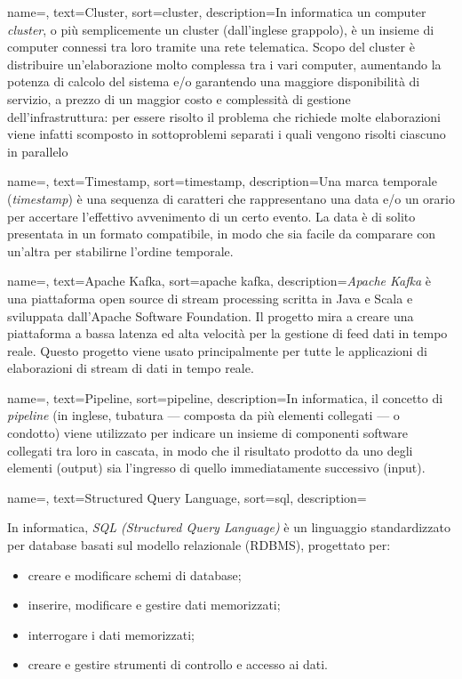 {
    name=,
    text=Cluster,
    sort=cluster,
    description={In informatica un computer \textit{cluster}, o più semplicemente un cluster (dall'inglese grappolo), è un insieme di computer connessi tra loro tramite una rete telematica. Scopo del cluster è distribuire un'elaborazione molto complessa tra i vari computer, aumentando la potenza di calcolo del sistema e/o garantendo una maggiore disponibilità di servizio, a prezzo di un maggior costo e complessità di gestione dell'infrastruttura: per essere risolto il problema che richiede molte elaborazioni viene infatti scomposto in sottoproblemi separati i quali vengono risolti ciascuno in parallelo}
}

{
    name=,
    text=Timestamp,
    sort=timestamp,
    description={Una marca temporale (\textit{timestamp}) è una sequenza di caratteri che rappresentano una data e/o un orario per accertare l'effettivo avvenimento di un certo evento. La data è di solito presentata in un formato compatibile, in modo che sia facile da comparare con un'altra per stabilirne l'ordine temporale.}
}

{
    name=,
    text=Apache Kafka,
    sort=apache kafka,
    description={\textit{Apache Kafka} è una piattaforma open source di stream processing scritta in Java e Scala e sviluppata dall'Apache Software Foundation. Il progetto mira a creare una piattaforma a bassa latenza ed alta velocità per la gestione di feed dati in tempo reale. Questo progetto viene usato principalmente per tutte le applicazioni di elaborazioni di stream di dati in tempo reale.}
}

{
    name=,
    text=Pipeline,
    sort=pipeline,
    description={In informatica, il concetto di \textit{pipeline} (in inglese, tubatura — composta da più elementi collegati — o condotto) viene utilizzato per indicare un insieme di componenti software collegati tra loro in cascata, in modo che il risultato prodotto da uno degli elementi (output) sia l'ingresso di quello immediatamente successivo (input).}
}

{
    name=,
    text=Structured Query Language,
    sort=sql,
    description={In informatica, \textit{SQL (Structured Query Language)} è un linguaggio standardizzato per database basati sul modello relazionale (RDBMS), progettato per:
    \begin{itemize}
    	\item{creare e modificare schemi di database;}
    	\item{inserire, modificare e gestire dati memorizzati;}
    	\item{interrogare i dati memorizzati;}
    	\item{creare e gestire strumenti di controllo e accesso ai dati.}
    \end{itemize}
    }
}

